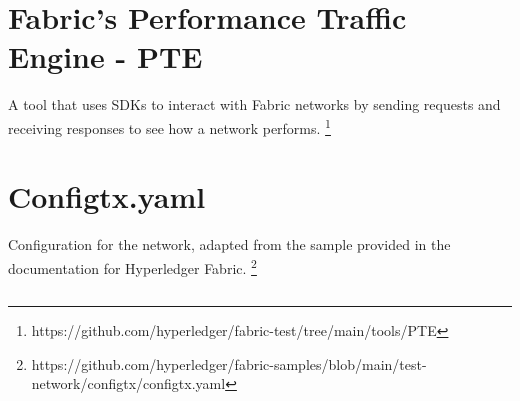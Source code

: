 \section{Fabric's Performance Traffic Engine - PTE}
A tool that uses SDKs to interact with Fabric networks by sending requests and receiving responses to see how a network performs. \footnote{https://github.com/hyperledger/fabric-test/tree/main/tools/PTE} \label{appendix:pte}

\section{Configtx.yaml}
Configuration for the network, adapted from the sample provided in the documentation for Hyperledger Fabric. \footnote{https://github.com/hyperledger/fabric-samples/blob/main/test-network/configtx/configtx.yaml} \label{appendix:configtx}

\begin{lstlisting}

\end{lstlisting}